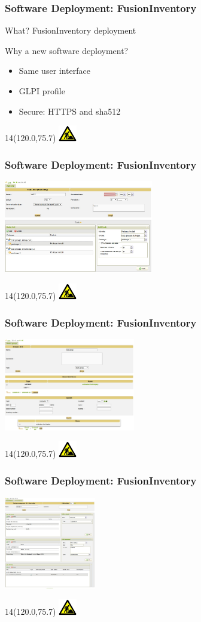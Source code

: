 \documentclass{beamer}
\newcommand{\WorkInProgress}{%
\begin{textblock}{14}(120.0,75.7)
\includegraphics[height=0.7cm]{./pics/workinprogress.jpg}
\end{textblock}
  }
\begin{document}
\begin{frame}
    \frametitle{Software Deployment: FusionInventory}

    \begin{block}{What?}
    FusionInventory deployment
    \end{block}

    \begin{block}{Why a new software deployment?}
    \begin{itemize}
        \item Same user interface
        \item GLPI profile
        \item Secure: HTTPS and sha512 
    \end{itemize}
    \end{block}

\WorkInProgress
\end{frame}


\begin{frame}
    \frametitle{Software Deployment: FusionInventory}

    \includegraphics[height=4.0cm]{pics/tasks.jpg}

\WorkInProgress
\end{frame}


\begin{frame}
    \frametitle{Software Deployment: FusionInventory}

    \includegraphics[height=4.0cm]{pics/groups.jpg}

\WorkInProgress
\end{frame}

\begin{frame}
    \frametitle{Software Deployment: FusionInventory}

    \includegraphics[height=4.0cm]{pics/packages.jpg}

\WorkInProgress
\end{frame}
\end{document}
